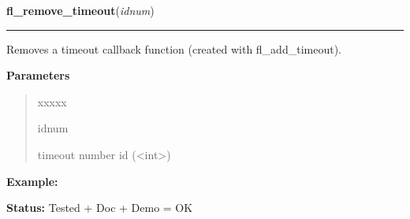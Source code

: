     \label{xformslib:library:fl_remove_timeout}

    \vspace{0.5ex}

\hspace{.8\funcindent}\begin{boxedminipage}{\funcwidth}

    \raggedright \textbf{fl\_remove\_timeout}(\textit{idnum})

    \vspace{-1.5ex}

    \rule{\textwidth}{0.5\fboxrule}
\setlength{\parskip}{2ex}
    Removes a timeout callback function (created with fl\_add\_timeout).

\setlength{\parskip}{1ex}
      \textbf{Parameters}
      \vspace{-1ex}

      \begin{quote}
        \begin{Ventry}{xxxxx}

          \item[idnum]

          timeout number id ({\textless}int{\textgreater})

        \end{Ventry}

      \end{quote}

\textbf{Example:} 

\textbf{Status:} Tested + Doc + Demo = OK



    \end{boxedminipage}

    \label{xformslib:library:fl_library_version}

    \vspace{0.5ex}

